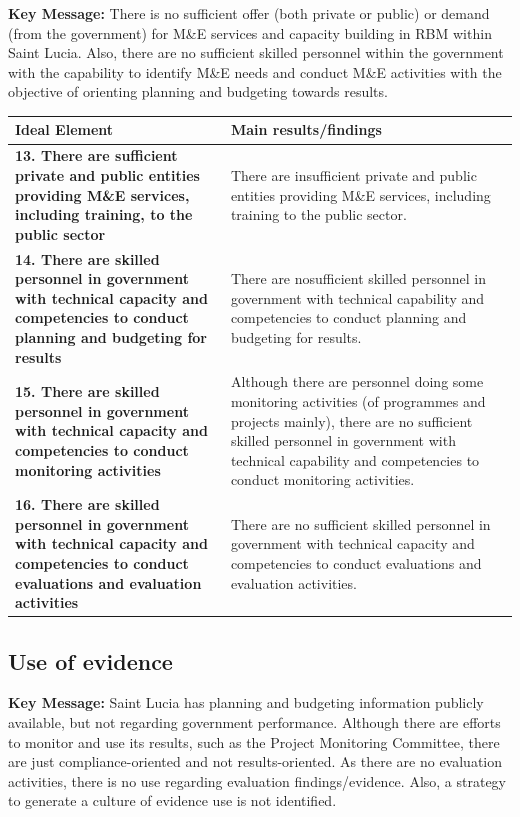 \documentclass[
  10pt,
]{book}
\begin{document}
\textbf{Key Message:}
There is no sufficient offer (both private or public) or demand (from the government) for M\&E services and capacity building in RBM within Saint Lucia. Also, there are no sufficient skilled personnel within the government with the capability to identify M\&E needs and conduct M\&E activities with the objective of orienting planning and budgeting towards results.

\begingroup\fontsize{12}{14}\selectfont

\begin{tabu} to 
\hline
Ideal Element & Main results/findings\\
\hline
\textbf{13. There are sufficient private and public entities providing M\&E services, including training, to the public sector} & There are insufficient private and public entities providing M\&E services, including training to the public sector.\\
\hline
\textbf{14. There are skilled personnel in government with technical capacity and competencies to conduct planning and budgeting for results} & There are nosufficient skilled personnel in government with technical capability and competencies to conduct planning and budgeting for results.\\
\hline
\textbf{15. There are skilled personnel in government with technical capacity and competencies to conduct monitoring activities} & Although there are personnel doing some monitoring activities (of programmes and projects mainly), there are no sufficient skilled personnel in government with technical capability and competencies to conduct monitoring activities.\\
\hline
\textbf{16. There are skilled personnel in government with technical capacity and competencies to conduct evaluations and evaluation activities} & There are no sufficient skilled personnel in government with technical capacity and competencies to conduct evaluations and evaluation activities.\\
\hline
\end{tabu}
\endgroup{}

\hypertarget{use-of-evidence}{%
\subsection{Use of evidence}\label{use-of-evidence}}

\textbf{Key Message:}
Saint Lucia has planning and budgeting information publicly available, but not regarding government performance. Although there are efforts to monitor and use its results, such as the Project Monitoring Committee, there are just compliance-oriented and not results-oriented. As there are no evaluation activities, there is no use regarding evaluation findings/evidence. Also, a strategy to generate a culture of evidence use is not identified.
\end{document}
